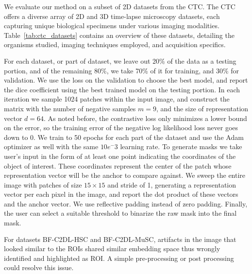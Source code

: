 \documentclass[./dissertation.tex]{subfiles}
\begin{document}
We evaluate our method on a subset of 2D datasets from the CTC. The CTC offers a diverse array of 2D and 3D time-lapse microscopy datasets, each capturing unique biological specimens under various imaging modalities. Table~\ref{tab:ctc_datasets} contains an overview of these datasets, detailing the organisms studied, imaging techniques employed, and acquisition specifics.

For each dataset, or part of dataset, we leave out 20\% of the data as a testing portion, and of the remaining 80\%, we take 70\% of it for training, and 30\% for validation. We use the loss on the validation to choose the best model, and report the dice coefficient using the best trained model on the testing portion. In each iteration we sample 1024 patches within the input image, and construct the matrix with the number of negative samples \(m = 9\), and the size of representation vector \(d = 64\). As noted before, the contrastive loss only minimizes a lower bound on the error, so the training error of the negative log likelihood loss never goes down to \(0\). We train to 50 epochs for each part of the dataset and use the Adam optimizer as well with the same \(10e^-3\) learning rate. To generate masks we take user's input in the form of at least one point indicating the coordinates of the object of interest. These coordinates represent the center of the patch whose representation vector will be the anchor to compare against. We sweep the entire image with patches of size \({15}\times{15}\) and stride of 1, generating a representation vector per each pixel in the image, and report the dot product of these vectors and the anchor vector. We use reflective padding instead of zero padding. Finally, the user can select a suitable threshold to binarize the raw mask into the final mask.

For datasets BF-C2DL-HSC and BF-C2DL-MuSC, artifacts in the image that looked similar to the ROIs shared similar embedding space thus wrongly identified and highlighted as ROI. A simple pre-processing or post processing could resolve this issue.
\end{document}
